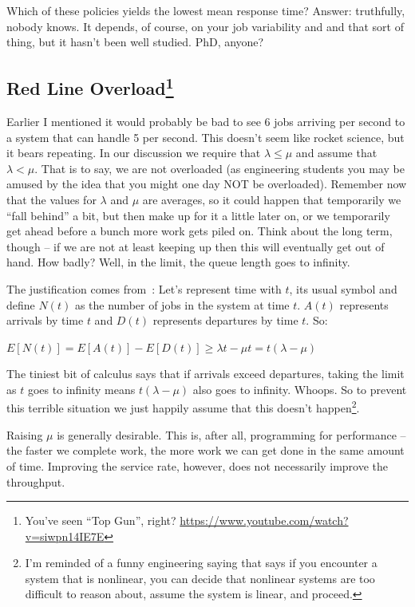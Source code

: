 \documentclass[a4paper]{report}
\begin{document}
Which of these policies yields the lowest mean response time? Answer: truthfully, nobody knows. It depends, of course, on your job variability and and that sort of thing, but it hasn't been well studied. PhD, anyone?

\subsection*{Red Line Overload\footnote{You've seen ``Top Gun'', right? \url{https://www.youtube.com/watch?v=siwpn14IE7E}}}

Earlier I mentioned it would probably be bad to see 6 jobs arriving per second to a system that can handle 5 per second. This doesn't seem like rocket science, but it bears repeating. In our discussion we require that $\lambda \leq \mu$ and assume that $\lambda < \mu$. That is to say, we are not overloaded (as engineering students you may be amused by the idea that you might one day NOT be overloaded). Remember now that the values for $\lambda$ and $\mu$ are averages, so it could happen that temporarily we ``fall behind'' a bit, but then make up for it a little later on, or we temporarily get ahead before a bunch more work gets piled on. Think about the long term, though -- if we are not at least keeping up then this will eventually get out of hand. How badly? Well, in the limit, the queue length goes to infinity.

The justification comes from~\cite{pmd}: Let's represent time with $t$, its usual symbol and define $N(t)$ as the number of jobs in the system at time $t$. $A(t)$ represents arrivals by time $t$ and $D(t)$ represents departures by time $t$. So:

\begin{center}
	$E[N(t)] = E[A(t)] - E[D(t)] \geq \lambda t - \mu t = t (\lambda - \mu) $
\end{center}

The tiniest bit of calculus says that if arrivals exceed departures, taking the limit as $t$ goes to infinity means $t (\lambda - \mu) $ also goes to infinity. Whoops. So to prevent this terrible situation we just happily assume that this doesn't happen\footnote{I'm reminded of a funny engineering saying that says if you encounter a system that is nonlinear, you can decide that nonlinear systems are too difficult to reason about, assume the system is linear, and proceed.}. 

Raising $\mu$ is generally desirable. This is, after all, programming for performance -- the faster we complete work, the more work we can get done in the same amount of time. Improving the service rate, however, does not necessarily improve the throughput. 
\end{document}
